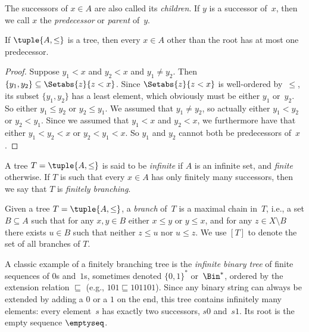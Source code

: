 \documentclass[../../../include/open-logic-section]{subfiles}
\begin{document}
The successors of $x \in A$ are also called its \emph{children}. If
$y$ is a successor of~$x$, then we call $x$ the \emph{predecessor} or
\emph{parent} of~$y$.

\begin{prop}
If $\tuple{A,\le}$ is a tree, then every $x \in A$ other than the root
has at most one predecessor.
\end{prop}

\begin{proof}
  Suppose $y_1 < x$ and $y_2 < x$ and $y_1 \neq y_2$. Then $\{y_1,
  y_2\} \subseteq \Setabs{z}{z<x}$. Since $\Setabs{z}{z<x}$ is
  well-ordered by~$\le$, its subset $\{y_1, y_2\}$ has a least
  element, which obviously must be either $y_1$ or~$y_2$. So either
  $y_1 \le y_2$ or $y_2 \le y_1$. We assumed that $y_1 \neq y_2$, so
  actually either $y_1 < y_2$ or $y_2 < y_1$. Since we assumed that
  $y_1 < x$ and $y_2 < x$, we furthermore have that either $y_1 < y_2
  < x$ or $y_2 < y_1 < x$. So $y_1$ and $y_2$ cannot both be
  predecessors of~$x$.
\end{proof}

\begin{defn}
A tree $T = \tuple{A, \le}$ is said to be \emph{infinite} if $A$ is an
infinite set, and \emph{finite} otherwise. If $T$ is such that every
$x \in A$ has only finitely many successors, then we say that $T$ is
\emph{finitely branching}.
\end{defn}

\begin{defn}[Branches]
Given a tree $T = \tuple{A, \le}$, a \emph{branch} of~$T$ is a
maximal chain in~$T$, i.e., a set $B \subseteq A$ such that
for any $x, y \in B$ either $x \le y$ or $y \le x$, and for any
$z \in X \setminus B$ there exists $u \in B$ such that neither
$z \le u$ nor $u \le z$.
%
We use $[T]$ to denote the set of all branches of $T$.
\end{defn}

\begin{ex}
A classic example of a finitely branching tree is the
\emph{infinite binary tree} of finite sequences of $0$s and~$1$s,
sometimes denoted $\{0,1\}^*$ or~$\Bin^*$, ordered by the extension
relation $\sqsubseteq$ (e.g., $101 \sqsubseteq 101101$).
Since any binary string can always be extended by adding
a $0$ or a $1$ on the end, this tree contains infinitely
many elements: every element~$s$ has exactly two successors, $s0$ and~$s1$. Its root is the empty sequence $\emptyseq$.
\end{ex}
\end{document}
